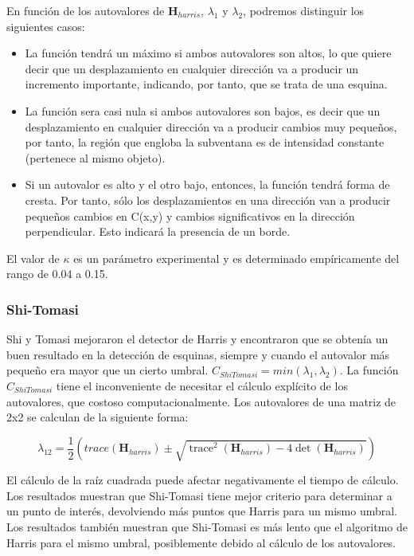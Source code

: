 En función de los autovalores de $\textbf{H}_{harris}$, $\lambda_1$ y $\lambda_2$, podremos distinguir los siguientes casos:
\begin{itemize} 
\item La función tendrá un máximo si ambos autovalores son altos, lo que quiere decir que un desplazamiento en cualquier dirección  va a producir un incremento importante, indicando, por tanto, que se trata de una esquina.

\item La función sera casi nula si ambos autovalores son bajos, es decir que un desplazamiento en cualquier dirección va a producir cambios muy pequeños, por tanto, la región que engloba la subventana es de intensidad constante (pertenece al mismo objeto).

\item Si un autovalor es alto y el otro bajo, entonces, la función tendrá forma de cresta. Por tanto, sólo los desplazamientos en una dirección van a producir pequeños cambios en C(x,y) y cambios significativos en la dirección perpendicular. Esto indicará la presencia de un borde.
\end{itemize}

El valor de $\kappa$ es un parámetro experimental y es determinado empíricamente del rango de 0.04 a 0.15.

\subsubsection{Shi-Tomasi} 
Shi y Tomasi \cite{ShiTomasi} mejoraron el detector de Harris y encontraron que se obtenía un buen resultado en la detección de esquinas, siempre y cuando el autovalor más pequeño era mayor que un cierto umbral. $C_{ShiTomasi} = min(\lambda_{1}, \lambda_{2})$. La función $C_{ShiTomasi}$ tiene el inconveniente de necesitar el cálculo explícito de los autovalores, que costoso computacionalmente. Los autovalores de una matriz de 2x2 se calculan de la siguiente forma: 

\begin{equation}
  \lambda_{12} = \dfrac{1}{2}(trace(\textbf{H}_{harris}) \pm \sqrt{\operatorname{trace}^{2}(\textbf{H}_{harris}) - 4 \operatorname{det}(\textbf{H}_{harris})})
\end{equation}

El cálculo de la raíz cuadrada puede afectar negativamente el tiempo de cálculo. Los resultados muestran que Shi-Tomasi tiene mejor criterio para determinar a un punto de interés, devolviendo más puntos que Harris para un mismo umbral. Los resultados también muestran que Shi-Tomasi es más lento que el algoritmo de Harris para el mismo umbral, posiblemente debido al cálculo de los autovalores. 

